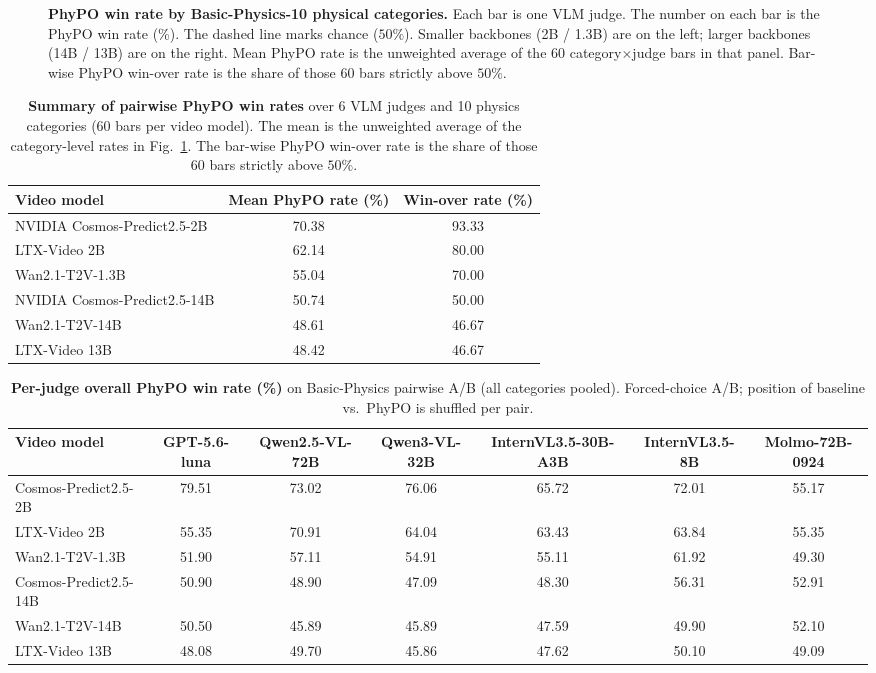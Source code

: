 \documentclass{article}
\begin{document}
\begin{figure}[t]
\centering
\caption{\textbf{PhyPO win rate by Basic-Physics-10 physical categories.}
Each bar is one VLM judge. The number on each bar is the PhyPO win rate (\%).
The dashed line marks chance ($50\%$).
Smaller backbones (2B / 1.3B) are on the left; larger backbones (14B / 13B) are on the right.
Mean PhyPO rate is the unweighted average of the 60 category$\times$judge bars in that panel.
Bar-wise PhyPO win-over rate is the share of those 60 bars strictly above $50\%$.}
\label{fig:phypo-all-models}
\end{figure}

\begin{table}[t]
\centering
\small
\setlength{\tabcolsep}{4pt}
\caption{\textbf{Summary of pairwise PhyPO win rates} over 6 VLM judges and 10 physics categories (60 bars per video model).
The mean is the unweighted average of the category-level rates in Fig.~\ref{fig:phypo-all-models}.
The bar-wise PhyPO win-over rate is the share of those 60 bars strictly above $50\%$.}
\label{tab:phypo-vlm-summary}
\begin{tabular}{lcc}
\toprule
Video model & Mean PhyPO rate (\%) & Win-over rate (\%) \\
\midrule
NVIDIA Cosmos-Predict2.5-2B  & 70.38 & 93.33 \\
LTX-Video 2B                 & 62.14 & 80.00 \\
Wan2.1-T2V-1.3B              & 55.04 & 70.00 \\
NVIDIA Cosmos-Predict2.5-14B & 50.74 & 50.00 \\
Wan2.1-T2V-14B               & 48.61 & 46.67 \\
LTX-Video 13B                & 48.42 & 46.67 \\
\bottomrule
\end{tabular}
\end{table}

\begin{table}[t]
\centering
\footnotesize
\setlength{\tabcolsep}{4pt}
\caption{\textbf{Per-judge overall PhyPO win rate (\%)} on Basic-Physics pairwise A/B (all categories pooled).
Forced-choice A/B; position of baseline vs.\ PhyPO is shuffled per pair.}
\label{tab:phypo-vlm-per-judge}
\begin{tabular}{lcccccc}
\toprule
Video model
  & GPT-5.6-luna
  & Qwen2.5-VL-72B
  & Qwen3-VL-32B
  & InternVL3.5-30B-A3B
  & InternVL3.5-8B
  & Molmo-72B-0924 \\
\midrule
Cosmos-Predict2.5-2B  & 79.51 & 73.02 & 76.06 & 65.72 & 72.01 & 55.17 \\
LTX-Video 2B          & 55.35 & 70.91 & 64.04 & 63.43 & 63.84 & 55.35 \\
Wan2.1-T2V-1.3B       & 51.90 & 57.11 & 54.91 & 55.11 & 61.92 & 49.30 \\
Cosmos-Predict2.5-14B & 50.90 & 48.90 & 47.09 & 48.30 & 56.31 & 52.91 \\
Wan2.1-T2V-14B        & 50.50 & 45.89 & 45.89 & 47.59 & 49.90 & 52.10 \\
LTX-Video 13B         & 48.08 & 49.70 & 45.86 & 47.62 & 50.10 & 49.09 \\
\bottomrule
\end{tabular}
\end{table}
\end{document}
